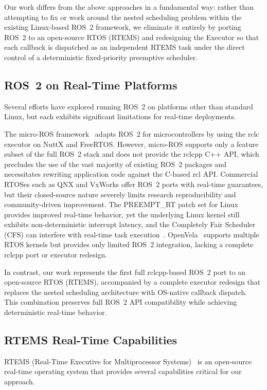 Our work differs from the above approaches in a fundamental way: rather than attempting to fix or work around the nested scheduling problem within the existing Linux-based ROS~2 framework, we eliminate it entirely by porting ROS~2 to an open-source RTOS (RTEMS) and redesigning the Executor so that each callback is dispatched as an independent RTEMS task under the direct control of a deterministic fixed-priority preemptive scheduler.

\subsection{ROS~2 on Real-Time Platforms}

Several efforts have explored running ROS~2 on platforms other than standard Linux, but each exhibits significant limitations for real-time deployments.

The micro-ROS framework~\cite{micrROS} adapts ROS~2 for microcontrollers by using the rclc executor on NuttX and FreeRTOS. However, micro-ROS supports only a feature subset of the full ROS~2 stack and does not provide the rclcpp C++ API, which precludes the use of the vast majority of existing ROS~2 packages and necessitates rewriting application code against the C-based rcl API. Commercial RTOSes such as QNX and VxWorks offer ROS~2 ports with real-time guarantees, but their closed-source nature severely limits research reproducibility and community-driven improvement. The PREEMPT\_RT patch set for Linux provides improved real-time behavior, yet the underlying Linux kernel still exhibits non-deterministic interrupt latency, and the Completely Fair Scheduler (CFS) can interfere with real-time task execution~\cite{reghenzani2019}. OpenVela~\cite{openvela} supports multiple RTOS kernels but provides only limited ROS~2 integration, lacking a complete rclcpp port or executor redesign.

In contrast, our work represents the first full rclcpp-based ROS~2 port to an open-source RTOS (RTEMS), accompanied by a complete executor redesign that replaces the nested scheduling architecture with OS-native callback dispatch. This combination preserves full ROS~2 API compatibility while achieving deterministic real-time behavior.

\subsection{RTEMS Real-Time Capabilities}

RTEMS (Real-Time Executive for Multiprocessor Systems)~\cite{rtems} is an open-source real-time operating system that provides several capabilities critical for our approach.

